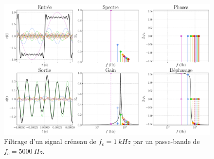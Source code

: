 \documentclass[../../main/main.tex]{subfiles}
\begin{document}
\begin{figure}[htbp]
	\centering
	\includegraphics[width=.95\linewidth]{fft_creneau_bth_bande-fe=1000-fc=5000}
	\caption{Filtrage d'un signal créneau de $f_e = \SI{1}{kHz}$ par un
		passe-bande de $f_c = \SI{5000}{Hz}$.}
	\label{fig:creneauPBD}
\end{figure}
\end{document}
